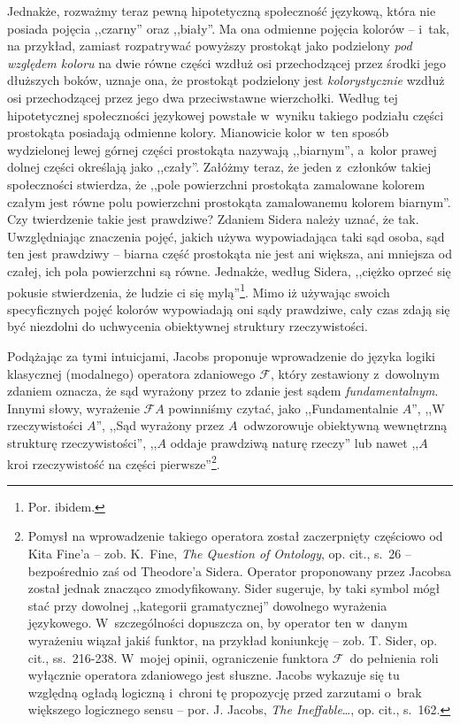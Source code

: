 Jednakże, rozważmy teraz pewną hipotetyczną społeczność językową, która nie posiada pojęcia ,,czarny'' oraz ,,biały''. Ma ona odmienne pojęcia kolorów -- i~tak, na przykład, zamiast rozpatrywać powyższy prostokąt jako podzielony \textit{pod względem koloru} na dwie równe części wzdłuż osi przechodzącej przez środki jego dłuższych boków, uznaje ona, że prostokąt podzielony jest \textit{kolorystycznie} wzdłuż osi przechodzącej przez jego dwa przeciwstawne wierzchołki. Według tej hipotetycznej społeczności językowej powstałe w~wyniku takiego podziału części prostokąta posiadają odmienne kolory. Mianowicie kolor w~ten sposób wydzielonej lewej górnej części prostokąta nazywają ,,biarnym'', a~kolor prawej dolnej części określają jako ,,czały''. Załóżmy teraz, że jeden z~członków takiej społeczności stwierdza, że ,,pole powierzchni prostokąta zamalowane kolorem czałym jest równe polu powierzchni prostokąta zamalowanemu kolorem biarnym''. Czy twierdzenie takie jest prawdziwe? Zdaniem Sidera należy uznać, że tak. Uwzględniając znaczenia pojęć, jakich używa wypowiadająca taki sąd osoba, sąd ten jest prawdziwy -- biarna część prostokąta nie jest ani większa, ani mniejsza od czałej, ich pola powierzchni są równe. Jednakże, według Sidera, ,,ciężko oprzeć się pokusie stwierdzenia, że ludzie ci się mylą''\footnote{Por. ibidem.}. Mimo iż używając swoich specyficznych pojęć kolorów wypowiadają oni sądy prawdziwe, cały czas zdają się być niezdolni do uchwycenia obiektywnej struktury rzeczywistości.

Podążając za tymi intuicjami, Jacobs proponuje wprowadzenie do języka logiki klasycznej (modalnego) operatora zdaniowego $\mathscr{F}$, który zestawiony z~dowolnym zdaniem oznacza, że sąd wyrażony przez to zdanie jest sądem \textit{fundamentalnym}. Innymi słowy, wyrażenie $\mathscr{F}A$ powinniśmy czytać, jako ,,Fundamentalnie $A$'', ,,W rzeczywistości $A$'', ,,Sąd wyrażony przez $A$~odwzorowuje obiektywną wewnętrzną strukturę rzeczywistości'', ,,$A$ oddaje prawdziwą naturę rzeczy'' lub nawet ,,$A$ kroi rzeczywistość na części pierwsze''\footnote{Pomysł na wprowadzenie takiego operatora został zaczerpnięty częściowo od Kita Fine'a -- zob. K.~Fine, \textit{The Question of Ontology}, op. cit., s.~26 -- bezpośrednio zaś od Theodore'a Sidera. Operator proponowany przez Jacobsa został jednak znacząco zmodyfikowany. Sider sugeruje, by taki symbol mógł stać przy dowolnej ,,kategorii gramatycznej'' dowolnego wyrażenia językowego. W~szczególności dopuszcza on, by operator ten w~danym wyrażeniu wiązał jakiś funktor, na przykład koniunkcję -- zob. T. Sider, op. cit., ss.~216-238. W~mojej opinii, ograniczenie funktora $\mathscr{F}$~do pełnienia roli wyłącznie operatora zdaniowego jest słuszne. Jacobs wykazuje się tu względną ogładą logiczną i~chroni tę propozycję przed zarzutami o~brak większego logicznego sensu -- por. J. Jacobs, \textit{The Ineffable}\ldots, op. cit., s.~162.}.

